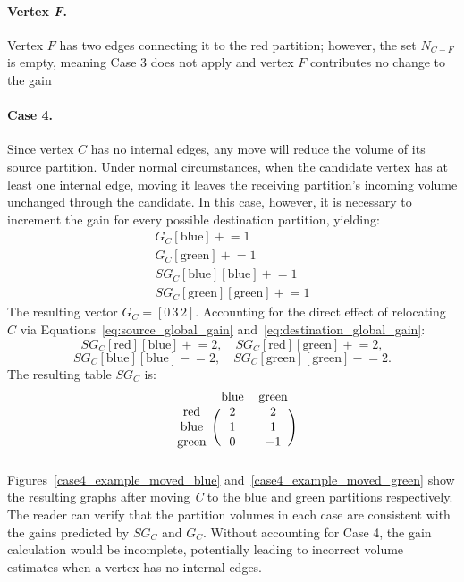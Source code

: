 \paragraph{Vertex \textit{F}.} Vertex $F$ has two edges connecting it to the red partition; however, the set $N_{C-F}$ is empty, meaning Case 3 does not apply and vertex $F$ contributes no change to the gain

\paragraph{Case 4.} Since vertex $C$ has no internal edges, any move will reduce the volume of its source partition. Under normal circumstances, when the candidate vertex has at least one internal edge, moving it leaves the receiving partition's incoming volume unchanged through the candidate. In this case, however, it is necessary to increment the gain for every possible destination partition, yielding:
\begin{align*}
 	G_C[\text{blue}]\mathrel{+}= 1 \\
 	G_C[\text{green}]\mathrel{+}= 1 \\
 	SG_C[\text{blue}][\text{blue}] \mathrel{+}= 1 \\
 	SG_C[\text{green}][\text{green}] \mathrel{+}= 1
\end{align*}
The resulting vector $G_C = [0\,3\,2]$. Accounting for the direct effect of relocating $C$ via Equations~\ref{eq:source_global_gain} and~\ref{eq:destination_global_gain}:
\[
SG_C[\text{red}][\text{blue}] \mathrel{+}= 2, \quad
SG_C[\text{red}][\text{green}] \mathrel{+}= 2,
\]
\[
SG_C[\text{blue}][\text{blue}] \mathrel{-}= 2, \quad
SG_C[\text{green}][\text{green}] \mathrel{-}= 2.
\]
The resulting table $SG_C$ is:
\[
\begin{blockarray}{ccc}
	& \text{blue} & \text{green} \\
	\begin{block}{c(cc)}
		\text{red}   & 2 & 2 \\
		\text{blue}  & 1 & 1 \\
		\text{green} & 0 & -1 \\
	\end{block}
\end{blockarray}
\]
Figures~\ref{case4_example_moved_blue} and~\ref{case4_example_moved_green} show the resulting graphs after moving \textit{C} to the blue and green partitions respectively. The reader can verify that the partition volumes in each case are consistent with the gains predicted by $SG_C$ and $G_C$. Without accounting for Case 4, the gain calculation would be incomplete, potentially leading to incorrect volume estimates when a vertex has no internal edges.
